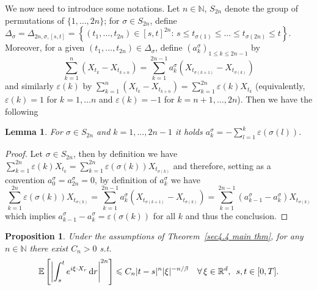 \documentclass[10pt]{article}
\newcommand{\mathd}{\mathrm{d}}
\newtheorem{lemma}[theorem]{Lemma}
\newtheorem{proposition}[theorem]{Proposition}
\begin{document}
We now need to introduce some notations. Let $n \in \mathbb{N}$, $S_{2 n}$
denote the group of permutations of $\{ 1, \ldots, 2 n \}$; for $\sigma \in
S_{2 n}$, define $\Delta_{\sigma} = \Delta_{2 n, \sigma, [s, t]} = \left\{
(t_1, \ldots, t_{2 n}) \in [s, t]^{2 n} : \, s \leqslant t_{\sigma (1)}
\leqslant \ldots \leqslant t_{\sigma (2 n)} \leqslant t \right\}$. Moreover,
for a given $(t_1, \ldots, t_{2 n}) \in \Delta_{\sigma}$, define
$(a_k^{\sigma})_{1 \leqslant k \leqslant 2 n - 1}$ by
\[ \sum_{k = 1}^n (X_{t_k} - X_{t_{k + n}}) = \sum_{k = 1}^{2 n - 1}
   a_k^{\sigma} (X_{t_{\sigma (k + 1)}} - X_{t_{\sigma (k)}}) \]
and similarly $\varepsilon (k)$ by $\sum_{k = 1}^n (X_{t_k} - X_{t_{k + n}}) =
\sum_{k = 1}^{2 n} \varepsilon (k) X_{t_k}$ (equivalently, $\varepsilon (k) =
1$ for $k = 1, \ldots n$ and $\varepsilon (k) = - 1$ for $k = n + 1, \ldots, 2
n$). Then we have the following

\begin{lemma}
  \label{sec4.4 combinatorial lemma}For $\sigma \in S_{2 n}$ and $k = 1,
  \ldots, 2 n - 1$ it holds $a_k^{\sigma} = - \sum_{l = 1}^k \varepsilon
  (\sigma (l))$.
\end{lemma}

\begin{proof}
  Let $\sigma \in S_{2 n}$, then by definition we have $\sum_{k = 1}^{2 n}
  \varepsilon (k) X_{t_k} = \sum_{k = 1}^{2 n} \varepsilon (\sigma (k))
  X_{t_{\sigma (k)}}$ and therefore, setting as a convention $a^{\sigma}_0 =
  a^{\sigma}_{2 n} = 0$, by definition of $a^{\sigma}_k$ we have
  \[ \sum_{k = 1}^{2 n} \varepsilon (\sigma (k)) X_{t_{\sigma (k)}} = \sum_{k
     = 1}^{2 n - 1} a_k^{\sigma} (X_{t_{\sigma (k + 1)}} - X_{t_{\sigma (k)}})
     = \sum_{k = 1}^{2 n - 1} (a_{k - 1}^{\sigma} - a_k^{\sigma}) X_{t_{\sigma
     (k)}} \]
  which implies $a_{k - 1}^{\sigma} - a_k^{\sigma} = \varepsilon (\sigma (k))$
  for all $k$ and thus the conclusion.
\end{proof}

\begin{proposition}
  \label{sec4.4 main proposition}Under the assumptions of Theorem~\ref{sec4.4
  main thm}, for any $n \in \mathbb{N}$ there exist $C_n > 0$ s.t.
  \begin{equation}
    \mathbb{E} \left[ \left| \int_s^t e^{i \xi \cdot X_r} \, \mathd r
    \right|^{2 n} \right] \leqslant C_n | t - s |^n  | \xi |^{- n / \beta}
    \quad \forall \, \xi \in \mathbb{R}^d, \hspace{0.5em} s, t \in [0, T] .
  \end{equation}
\end{proposition}
\end{document}
